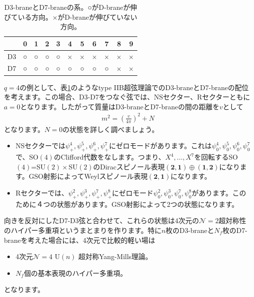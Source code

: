 \documentclass[report,paper=a4, fontsize=12pt, line_length=16cm, number_of_lines=34,dvipdfmx]{jlreq}
\numberwithin{equation}{chapter}
\numberwithin{equation}{section}
\newcommand{\Ncal}{\mathcal{N}}
\begin{document}
\begin{table}
  \centering
  \begin{tabular}{|c||c|c|c|c|c|c|c|c|c|c|}\hline
    &0 &1 &2 &3 &4 &5 &6 &7 &8 &9 \\ \hline\hline
  D3&○&○&○&○&×&×&×&×&×&×\\ \hline    
  D7&○&○&○&○&○&○&○&○&×&×\\ \hline    
  \end{tabular}
  \caption{D3-braneとD7-braneの系。○がD-braneが伸びている方向。×がD-braneが伸びていない方向。}
  \label{tab:D3D7}
\end{table}
$q=4$の例として、表\ref{tab:D3D7}のようなtype IIB超弦理論でのD3-braneとD7-braneの配位を考えます。この場合、D3-D7をつなぐ弦では、NSセクター、Rセクターともに$a=0$となります。したがって質量はD3-braneとD7-braneの間の距離を$v$として
\begin{align}
  m^2=\left( \frac{v}{4\pi} \right)^2+N
\end{align}
となります。$N=0$の状態を詳しく調べましょう。
\begin{itemize}
  \item NSセクターでは$\psi_{+}^{4},\psi_{+}^{5},\psi_{+}^{6},\psi_{+}^{7}$にゼロモードがあります。これは$\psi_{0}^{4},\psi_{0}^{5},\psi_{0}^{6},\psi_{0}^{7}$で、SO$(4)$のClifford代数をなします。つまり、$X^{4},\dots,X^{7}$を回転するSO$(4)$=SU$(2)\times$SU$(2)$のDiracスピノール表現$(\mathbf{2},\mathbf{1})\oplus(\mathbf{1},\mathbf{2})$になります。GSO射影によってWeylスピノール表現$(\mathbf{2},\mathbf{1})$になります。
  \item Rセクターでは、$\psi_{+}^{2},\psi_{+}^{3},\psi_{+}^{7},\psi_{+}^{8}$にゼロモード$\psi_{0}^{2},\psi_{0}^{3},\psi_{0}^{7},\psi_{0}^{8}$があります。このために４つの状態があります。GSO射影によって2つの状態になります。
\end{itemize}
向きを反対にしたD7-D3弦と合わせて、これらの状態は4次元の$\Ncal=2$超対称性のハイパー多重項というまとまりを作ります。特に$n$枚のD3-braneと$N_f$枚のD7-braneを考えた場合には、4次元で比較的軽い場は
\begin{itemize}
  \item 4次元$\Ncal=4$ U$(n)$ 超対称Yang-Mills理論。
  \item $N_f$個の基本表現のハイパー多重項。
\end{itemize}
となります。
\end{document}
